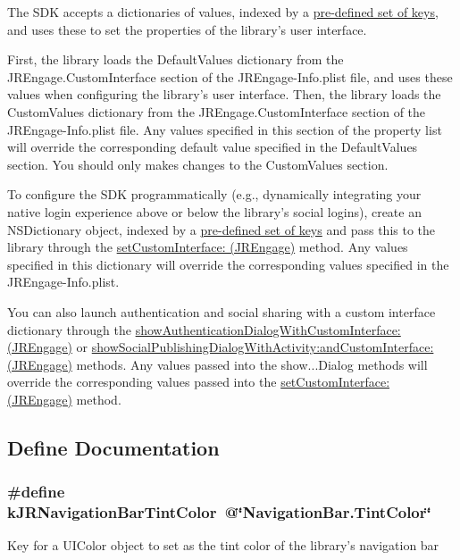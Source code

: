 The SDK accepts a dictionaries of values, indexed by a \hyperlink{group__custom_interface_customInterfaceKeys}{pre-\/defined set of keys}, and uses these to set the properties of the library's user interface.

First, the library loads the DefaultValues dictionary from the JREngage.CustomInterface section of the JREngage-\/Info.plist file, and uses these values when configuring the library's user interface. Then, the library loads the CustomValues dictionary from the JREngage.CustomInterface section of the JREngage-\/Info.plist file. Any values specified in this section of the property list will override the corresponding default value specified in the DefaultValues section. You should only makes changes to the CustomValues section.

To configure the SDK programmatically (e.g., dynamically integrating your native login experience above or below the library's social logins), create an NSDictionary object, indexed by a \hyperlink{group__custom_interface_customInterfaceKeys}{pre-\/defined set of keys} and pass this to the library through the \hyperlink{interface_j_r_engage_ab1757bbe9e83255b1b9128c630267fdf}{setCustomInterface: (JREngage)} method. Any values specified in this dictionary will override the corresponding values specified in the JREngage-\/Info.plist.

You can also launch authentication and social sharing with a custom interface dictionary through the \hyperlink{interface_j_r_engage_ac8e1206be8608fbed548b7ec5f85e6e6}{showAuthenticationDialogWithCustomInterface: (JREngage)} or \hyperlink{interface_j_r_engage_af5c2aa40f5c45a22f369900d1bd81953}{showSocialPublishingDialogWithActivity:andCustomInterface: (JREngage)} methods. Any values passed into the {\ttfamily show}...Dialog methods will override the corresponding values passed into the \hyperlink{interface_j_r_engage_ab1757bbe9e83255b1b9128c630267fdf}{setCustomInterface: (JREngage)} method. 

\subsection{Define Documentation}
\hypertarget{group__custom_interface_ga7c7ed7dac155537c9bc14531c5cec3cb}{
\subsubsection[{kJRNavigationBarTintColor}]{\setlength{\rightskip}{0pt plus 5cm}\#define kJRNavigationBarTintColor~@\char`\"{}NavigationBar.TintColor\char`\"{}}}
\label{group__custom_interface_ga7c7ed7dac155537c9bc14531c5cec3cb}
Key for a {\ttfamily UIColor} object to set as the tint color of the library's navigation bar

